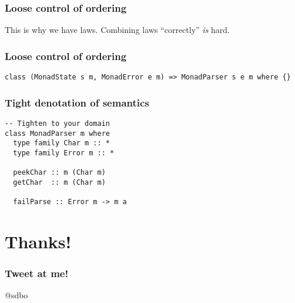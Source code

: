 \documentclass[pdf]{beamer}
\begin{document}
\begin{frame}
  \frametitle{Loose control of ordering}
  This is why we have laws.
  \pause
  Combining laws ``correctly'' \textit{is} hard.
\end{frame}

\begin{frame}[fragile]
  \frametitle{Loose control of ordering}
\begin{lstlisting}
class (MonadState s m, MonadError e m) => MonadParser s e m where {}
\end{lstlisting}
\end{frame}

\begin{frame}[fragile]
  \frametitle{Tight denotation of semantics}
\begin{lstlisting}
-- Tighten to your domain
class MonadParser m where
  type family Char m :: *
  type family Error m :: *

  peekChar :: m (Char m)
  getChar  :: m (Char m)
  
  failParse :: Error m -> m a
\end{lstlisting}
\end{frame}

\section{Thanks!}

\begin{frame}
  \frametitle{Tweet at me!}
  \begin{center}
    @sdbo
  \end{center}
\end{frame}
\end{document}
